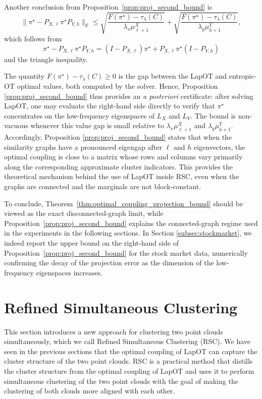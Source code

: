 \documentclass{article}
\theoremstyle{definition}
\begin{document}
Another conclusion from Proposition~\ref{prop:proj_second_bound} is
\[
    \|\pi^\star - P_{X, \ell} \pi^\star P_{Y, h}\|_{\mathrm{F}}
    \le
    \sqrt{\frac{F(\pi^\star) - \tau_\lambda(C)}{\lambda_x \mu^X_{\ell + 1}}}
    +
    \sqrt{\frac{F(\pi^\star) - \tau_\lambda(C)}{\lambda_y \mu^Y_{h + 1}}},
\]
which follows from
\[
    \pi^\star-P_{X,\ell}\pi^\star P_{Y,h}
    =
    (I-P_{X,\ell})\pi^\star
    +
    P_{X,\ell}\pi^\star(I-P_{Y,h})
\]
and the triangle inequality. 

The quantity $F(\pi^\star) - \tau_\lambda(C) \ge 0$ is the gap between the LapOT and entropic-OT optimal values, both computed by the solver. Hence, Proposition \ref{prop:proj_second_bound} thus provides an \emph{a posteriori} certificate: after solving LapOT, one may evaluate the right-hand side directly to verify that $\pi^\star$ concentrates on the low-frequency eigenspaces of $L_X$ and $L_Y$. The bound is non-vacuous whenever this value gap is small relative to $\lambda_x \mu^X_{\ell + 1}$ and $\lambda_y \mu^Y_{h + 1}$. Accordingly, Proposition \ref{prop:proj_second_bound} states that when the similarity graphs have a pronounced eigengap after $\ell$ and $h$ eigenvectors, the optimal coupling is close to a matrix whose rows and columns vary primarily along the corresponding approximate cluster indicators. This provides the theoretical mechanism behind the use of LapOT inside RSC, even when the graphs are connected and the marginals are not block-constant.

To conclude, Theorem~\ref{thm:optimal_coupling_projection_bound} should be viewed as the exact disconnected-graph limit, while Proposition~\ref{prop:proj_second_bound} explains the connected-graph regime used in the experiments in the following sections. In Section \ref{subsec:stockmarket}, we indeed report the upper bound on the right-hand side of Proposition~\ref{prop:proj_second_bound} for the stock market data, numerically confirming the decay of the projection error as the dimension of the low-frequency eigenspaces increases.


\section{Refined Simultaneous Clustering}
\label{sec:rsc}
This section introduces a new approach for clustering two point clouds simultaneously, which we call Refined Simultaneous Clustering (RSC). We have seen in the previous sections that the optimal coupling of LapOT can capture the cluster structure of the two point clouds. RSC is a practical method that distills the cluster structure from the optimal coupling of LapOT and uses it to perform simultaneous clustering of the two point clouds with the goal of making the clustering of both clouds more aligned with each other. 
\end{document}

